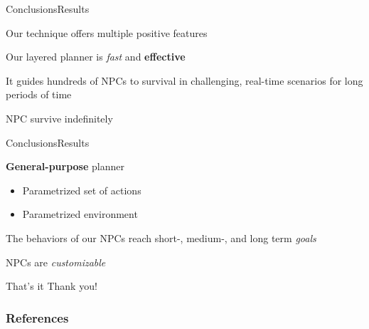 \documentclass{beamer}
\begin{document}
\begin{slide}{Conclusions}{Results}{
\item Our technique offers multiple positive features
\item Our layered planner is \textit{fast} and \textbf{effective}
\item It guides hundreds of NPCs to survival in challenging, real-time scenarios for long periods of time
\item NPC survive indefinitely
}\end{slide}

\begin{slide}{Conclusions}{Results}{
\item \textbf{General-purpose} planner
\begin{itemize}
\item Parametrized set of actions
\item Parametrized environment
\end{itemize}
\item The behaviors of our NPCs reach short-, medium-, and long term \textit{goals}
\item NPCs are \textit{customizable}
}\end{slide}

\begin{frame}{That's it}
\center
\fontsize{18pt}{7.2}\selectfont
Thank you!
\end{frame}

\begin{frame}[allowframebreaks]
\frametitle{References}


\end{frame}
\end{document}
